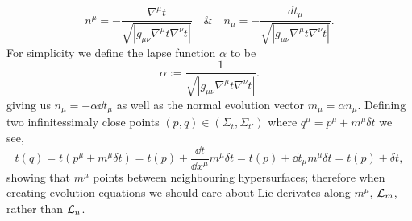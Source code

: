 \begin{equation} n^\mu = -\frac{\nabla^\mu t}{\sqrt{|g_{\mu\nu}\nabla^\mu t \nabla^\nu t|}} \quad \& \quad  n_\mu = -\frac{dt_\mu}{\sqrt{|g_{\mu\nu}\nabla^\mu t \nabla^\nu t|}}.\end{equation}
For simplicity we define the lapse function $\alpha$ to be
\begin{equation}\alpha :=  \frac{1}{\sqrt{|g_{\mu\nu}\nabla^\mu t \nabla^\nu t|}}. \end{equation}
giving us $n_\mu = -\alpha \dd t_\mu$ as well as the normal evolution vector $m_\mu = \alpha n_\mu$. Defining two infinitessimaly close points $(p,q)\in(\Sigma_t,\Sigma_{t'})$ where $ q^\mu = p^\mu + m^\mu\delta t$ we see,
\begin{equation} t(q) = t(p^\mu +  m^\mu\delta t) = t(p) + \frac{\dd t}{\dd x^\mu}m^\mu\delta t = t(p) + \dd t_\mu m^\mu \delta t =  t(p) + \delta t,\end{equation} 
showing that $m^\mu$ points between neighbouring hypersurfaces; therefore when creating evolution equations we should care about Lie derivates along $m^\mu$, $\mathcal{L}_m$, rather than $\mathcal{L}_n$.



